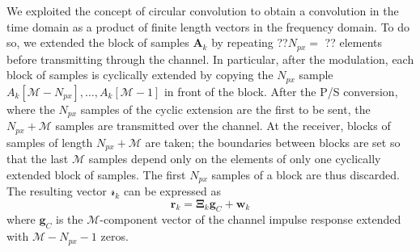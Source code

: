 \documentclass[a4paper, 12pt]{report}
\begin{document}
We exploited the concept of circular convolution to obtain a convolution in the time domain as a product of finite length vectors in the frequency domain. To do so, we extended the block of samples $\mathbf{A}_k$ by repeating ??$N_{px}=$ ?? elements before transmitting through the channel. In particular, after the modulation, each block of samples is cyclically extended by copying the $N_{px}$ sample $A_k[\mathcal{M}-N_{px}],\dots,A_k[\mathcal{M}-1]$ in front of the block. After the P/S conversion, where the $N_{px}$ samples of the cyclic extension are the first to be sent, the $N_{px}+\mathcal{M}$ samples are transmitted over the channel.  At the receiver, blocks of samples of length $N_{px}+\mathcal{M}$ are taken; the boundaries between blocks are set so that the last $\mathcal{M}$ samples depend only on the elements of only one cyclically extended block of samples. The first $N_{px}$ samples of a block are thus discarded. \\
The resulting vector $\mathcal{r}_k$ can be expressed as 
\begin{equation}
\mathbf{r}_k = \mathbf{\Xi}_k\mathbf{g}_C + \mathbf{w}_k
\end{equation}
where $\mathbf{g}_C$ is the $\mathcal{M}$-component vector of the channel impulse response extended with $\mathcal{M}-N_{px}-1$ zeros.
\end{document}
